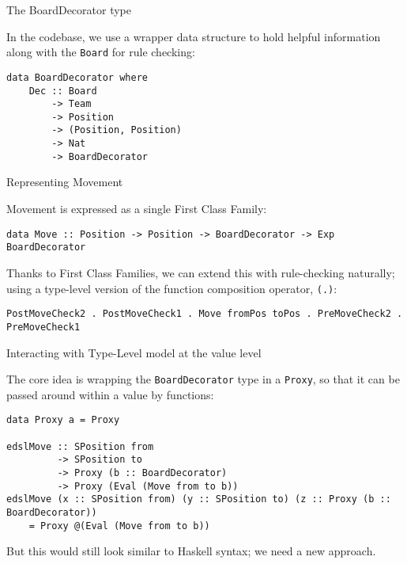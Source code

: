 \documentclass{beamer}
\newcommand{\inline}[1]{\lstinline[basicstyle=\ttfamily]{#1}}
\begin{document}
\begin{frame}[fragile]{The BoardDecorator type}

In the codebase, we use a wrapper data structure to hold helpful information along with the \inline{Board} for rule checking:

\begin{lstlisting}
data BoardDecorator where
    Dec :: Board
        -> Team
        -> Position
        -> (Position, Position)
        -> Nat
        -> BoardDecorator
\end{lstlisting}

\end{frame}

\begin{frame}[fragile]{Representing Movement}


Movement is expressed as a single First Class Family:

\begin{lstlisting}
data Move :: Position -> Position -> BoardDecorator -> Exp BoardDecorator
\end{lstlisting}

\pause

Thanks to First Class Families, we can extend this with rule-checking naturally; using a type-level version of the function composition operator, \inline{(.)}:

\begin{lstlisting}
PostMoveCheck2 . PostMoveCheck1 . Move fromPos toPos . PreMoveCheck2 . PreMoveCheck1
\end{lstlisting}

\end{frame}

\begin{frame}[fragile]{Interacting with Type-Level model at the value level}

The core idea is wrapping the \inline{BoardDecorator} type in a \inline{Proxy}, so that it can be passed around within a value by functions:

\begin{lstlisting}
data Proxy a = Proxy

edslMove :: SPosition from
         -> SPosition to
         -> Proxy (b :: BoardDecorator)
         -> Proxy (Eval (Move from to b))
edslMove (x :: SPosition from) (y :: SPosition to) (z :: Proxy (b :: BoardDecorator))
    = Proxy @(Eval (Move from to b))
\end{lstlisting}

\pause

But this would still look similar to Haskell syntax; we need a new approach.

\end{frame}
\end{document}
